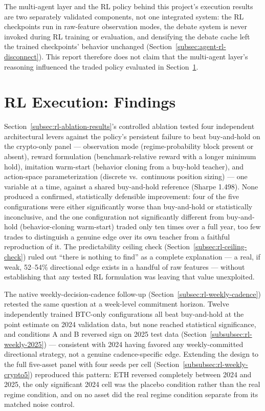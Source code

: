 The multi-agent layer and the RL policy behind this project's execution results are two separately validated components, not one integrated system: the RL checkpoints run in raw-feature observation modes, the debate system is never invoked during RL training or evaluation, and densifying the debate cache left the trained checkpoints' behavior unchanged (Section~\ref{subsec:agent-rl-disconnect}). This report therefore does not claim that the multi-agent layer's reasoning influenced the traded policy evaluated in Section~\ref{sec:conclusion-rl}.

\section{RL Execution: Findings}
\label{sec:conclusion-rl}

Section~\ref{subsec:rl-ablation-results}'s controlled ablation tested four independent architectural levers against the policy's persistent failure to beat buy-and-hold on the crypto-only panel --- observation mode (regime-probability block present or absent), reward formulation (benchmark-relative reward with a longer minimum hold), imitation warm-start (behavior cloning from a buy-hold teacher), and action-space parameterization (discrete vs.\ continuous position sizing) --- one variable at a time, against a shared buy-and-hold reference (Sharpe 1.498). None produced a confirmed, statistically defensible improvement: four of the five configurations were either significantly worse than buy-and-hold or statistically inconclusive, and the one configuration not significantly different from buy-and-hold (behavior-cloning warm-start) traded only ten times over a full year, too few trades to distinguish a genuine edge over its own teacher from a faithful reproduction of it. The predictability ceiling check (Section~\ref{subsec:rl-ceiling-check}) ruled out ``there is nothing to find'' as a complete explanation --- a real, if weak, 52--54\% directional edge exists in a handful of raw features --- without establishing that any tested RL formulation was leaving that value unexploited.

The native weekly-decision-cadence follow-up (Section~\ref{subsec:rl-weekly-cadence}) retested the same question at a week-level commitment horizon. Twelve independently trained BTC-only configurations all beat buy-and-hold at the point estimate on 2024 validation data, but none reached statistical significance, and conditions A and B reversed sign on 2025 test data (Section~\ref{subsubsec:rl-weekly-2025}) --- consistent with 2024 having favored any weekly-committed directional strategy, not a genuine cadence-specific edge. Extending the design to the full five-asset panel with four seeds per cell (Section~\ref{subsubsec:rl-weekly-crypto5}) reproduced this pattern: ETH reversed completely between 2024 and 2025, the only significant 2024 cell was the placebo condition rather than the real regime condition, and on no asset did the real regime condition separate from its matched noise control.

